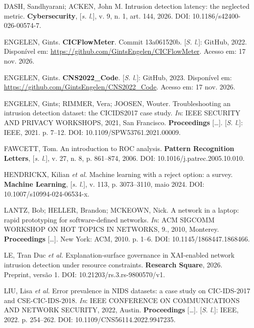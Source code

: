 \documentclass[
  12pt,
  oneside,
  a4paper,
  chapter=TITLE,
  sumario=tradicional,
  english,
  brazil
]{abntex2}
\begin{document}
DASH, Sandhyarani; ACKEN, John M. Intrusion detection latency: the neglected metric.
\textbf{Cybersecurity}, [\emph{s. l.}], v. 9, n. 1, art. 144, 2026. DOI:
10.1186/s42400-026-00574-7.\par

ENGELEN, Gints. \textbf{CICFlowMeter}. Commit 13a061520b. [\emph{S. l.}]: GitHub, 2022. Disponível
em: \url{https://github.com/GintsEngelen/CICFlowMeter}. Acesso em: 17 nov. 2026.\par

ENGELEN, Gints. \textbf{CNS2022\_Code}. [\emph{S. l.}]: GitHub, 2023. Disponível em:
\url{https://github.com/GintsEngelen/CNS2022_Code}. Acesso em: 17 nov. 2026.\par

ENGELEN, Gints; RIMMER, Vera; JOOSEN, Wouter. Troubleshooting an intrusion detection dataset: the
CICIDS2017 case study. \emph{In}: IEEE SECURITY AND PRIVACY WORKSHOPS, 2021, San Francisco.
\textbf{Proceedings} [\ldots]. [\emph{S. l.}]: IEEE, 2021. p. 7--12. DOI:
10.1109/SPW53761.2021.00009.\par

FAWCETT, Tom. An introduction to ROC analysis. \textbf{Pattern Recognition Letters}, [\emph{s. l.}],
v. 27, n. 8, p. 861--874, 2006. DOI: 10.1016/j.patrec.2005.10.010.\par

HENDRICKX, Kilian \emph{et al.} Machine learning with a reject option: a survey. \textbf{Machine
Learning}, [\emph{s. l.}], v. 113, p. 3073--3110, maio 2024. DOI: 10.1007/s10994-024-06534-x.\par

LANTZ, Bob; HELLER, Brandon; MCKEOWN, Nick. A network in a laptop: rapid prototyping for
software-defined networks. \emph{In}: ACM SIGCOMM WORKSHOP ON HOT TOPICS IN NETWORKS, 9., 2010,
Monterey. \textbf{Proceedings} [\ldots]. New York: ACM, 2010. p. 1--6. DOI:
10.1145/1868447.1868466.\par

LE, Tran Duc \emph{et al.} Explanation-surface governance in
XAI-enabled network intrusion detection under resource constraints. \textbf{Research Square},
2026. Preprint, versão 1. DOI: 10.21203/rs.3.rs-9800570/v1.\par

LIU, Lisa \emph{et al.} Error prevalence in NIDS
datasets: a case study on CIC-IDS-2017 and CSE-CIC-IDS-2018. \emph{In}: IEEE CONFERENCE ON
COMMUNICATIONS AND NETWORK SECURITY, 2022, Austin. \textbf{Proceedings} [\ldots]. [\emph{S. l.}]:
IEEE, 2022. p. 254--262. DOI: 10.1109/CNS56114.2022.9947235.\par
\end{document}

